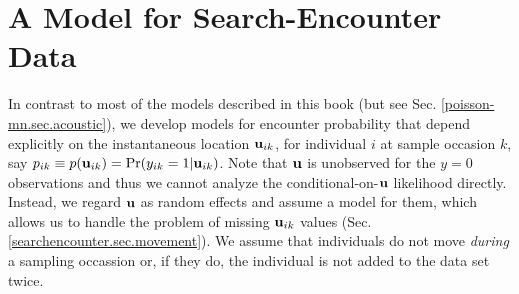 \section{A Model for Search-Encounter Data}


In contrast to most of the models described in this book (but see
Sec. \ref{poisson-mn.sec.acoustic}), we develop models for encounter
probability that depend explicitly on the instantaneous location ${\bf
  u}_{ik}$, for individual $i$ at sample occasion $k$, say $p_{ik}
\equiv p({\bf u}_{ik}) = \Pr(y_{ik}=1|{\bf u}_{ik})$.  Note that ${\bf
  u}$ is unobserved for the $y=0$ observations and thus we cannot
analyze the conditional-on-${\bf u}$ likelihood directly. Instead, we
regard ${\bf u}$ as random effects and assume a model for them, which
allows us to handle the problem of missing ${\bf u}_{ik}$ values
(Sec. \ref{searchencounter.sec.movement}).  We assume that individuals
do not move {\it during} a sampling occassion or, if they do, the
individual is not added to the data set twice.

